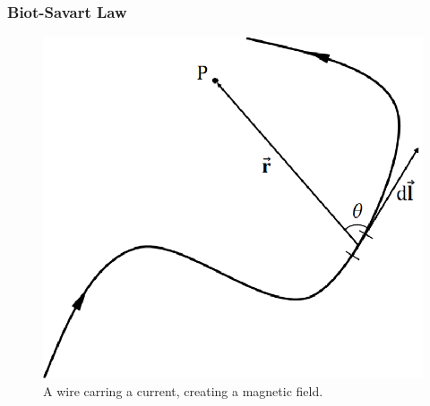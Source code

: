 \documentclass{scrartcl}
\begin{document}
    \subsubsection{Biot-Savart Law}
    \begin{figure}[H]
        \centering
        \includegraphics[scale=.6]{biot.eps}
        \caption{A wire carring a current, creating a magnetic field.}
    \end{figure}
\end{document}
